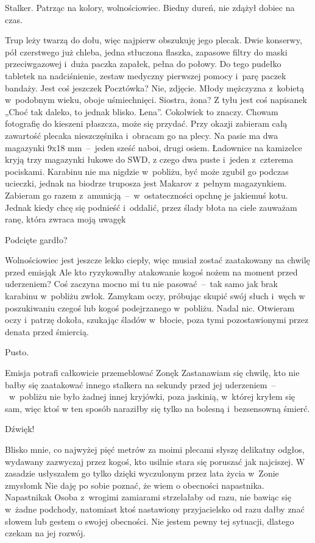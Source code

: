 \documentclass[../MAIN.tex]{subfiles}
\begin{document}
Stalker. Patrząc na kolory, wolnościowiec. Bied\-ny dureń, nie
zdążył dobiec na czas.

Trup leży twarzą do dołu, więc najpierw obszukuję jego plecak.
Dwie konserwy, pół czerstwego już chleba, jedna stłuczona
flaszka, zapasowe filtry do maski przeciwgazowej i~duża paczka
zapałek, pełna do połowy. Do tego pudełko tabletek na
nadciśnienie, zestaw medyczny pierwszej pomocy i~parę paczek
bandaży. Jest coś jeszcze\3k Pocztówka? Nie, zdjęcie. Młody
mężczyzna z~kobietą w~podobnym wieku, oboje uśmiechnięci.
Siostra, żona? Z tyłu jest coś napisane\3k „Choć tak daleko, to
jednak blisko. Lena”. Cokolwiek to znaczy. Chowam fotografię do
kieszeni płaszcza, może się przydać. Przy okazji zabieram całą
zawartość plecaka nieszczęśnika i~obracam go na plecy. Na pasie
ma dwa magazynki 9x18 mm~--~jeden sześć naboi, drugi osiem.
Ładownice na kamizelce kryją trzy magazynki łukowe do SWD, z
czego dwa puste i~jeden z~czterema pociskami. Karabinu nie ma
nigdzie w~pobliżu, być może zgubił go podczas ucieczki, jednak
na biodrze truposza jest Makarov z~pełnym magazynkiem. Zabieram
go razem z~amunicją~--~w~ostateczności opchnę je jakiemuś kotu.
Jednak kiedy chcę się podnieść i~oddalić, przez ślady błota na
ciele zauważam ranę, która zwraca moją uwagę\3k

Podcięte gardło?

Wolnościowiec jest jeszcze lekko ciepły, więc musiał zostać
zaatakowany na chwilę przed emisją\3k Ale kto ryzykowałby
atakowanie kogoś nożem na moment przed uderzeniem? Coś zaczyna
mocno mi tu nie pasować~--~tak samo jak brak karabinu w~pobliżu
zwłok. Zamykam oczy, próbując skupić swój słuch i~węch w
poszukiwaniu czegoś lub kogoś podejrzanego w~pobliżu. Nadal
nic. Otwieram oczy i~patrzę dokoła, szukając śladów w~błocie,
poza tymi pozostawionymi przez denata przed śmiercią.

Pusto.

Emisja potrafi całkowicie przemeblować Zonę\3k Zastanawiam się
chwilę, kto nie bałby się zaatakować innego stalkera na sekundy
przed jej uderzeniem~--~w~pobliżu nie było żadnej innej
kryjówki, poza jaskinią, w~której kryłem się sam, więc ktoś w
ten sposób naraziłby się tylko na bolesną i~bezsensowną śmierć.

Dźwięk!

Blisko mnie, co najwyżej pięć metrów za moimi plecami słyszę
delikatny odgłos, wydawany zazwyczaj przez kogoś, kto usilnie
stara się poruszać jak najciszej. W zasadzie usłyszałem go
tylko dzięki wyczulonym przez lata życia w~Zonie zmysłom\3k Nie
daję po sobie poznać, że wiem o obecności napastnika.
Napastnika\3k Osoba z~wrogimi zamiarami strzelałaby od razu,
nie
bawiąc się w~żadne podchody, natomiast ktoś nastawiony
przyjacielsko od razu dałby znać słowem lub gestem o swojej
obecności. Nie jestem pewny tej sytuacji, dlatego czekam na jej
rozwój.
\end{document}
